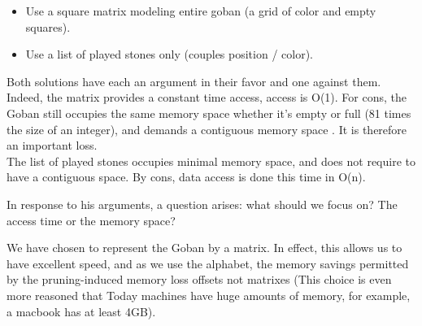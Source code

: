 \documentclass[11pt,a4paper]{report}
\begin{document}
 \begin{itemize}
\item    Use a square matrix modeling entire goban (a grid of color and empty squares). 
\item    Use a list of played stones only (couples position / color). 
\end{itemize}
\bigskip

Both solutions have each an argument in their favor and one against them. \\

Indeed, the matrix provides a constant time access, access is O(1). For cons, the Goban still occupies the same memory space whether it's empty or full (81 times the size of an integer), and demands a contiguous memory space . It is therefore an important loss. \\

The list of played stones occupies minimal memory space, and does not require to have a contiguous space. By cons, data access is done this time  in O(n). 
\bigskip



In response to his arguments, a question arises: what should we focus on? The access time or the memory space? 

We have chosen to represent the Goban by a matrix. In effect, this allows us to have excellent speed, and as we use the alphabet, the memory savings permitted by the pruning-induced memory loss offsets not matrixes (This choice is even more reasoned that Today machines have huge amounts of memory, for example, a macbook has at least 4GB).
\end{document}

